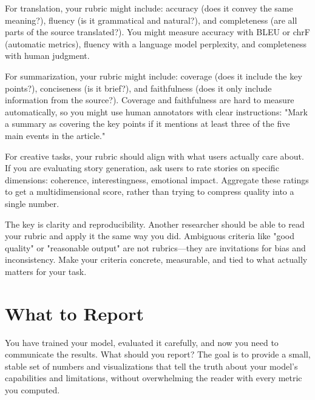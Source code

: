\vspace{0.3cm}

For translation, your rubric might include: accuracy (does it convey the same meaning?), fluency (is it grammatical and natural?), and completeness (are all parts of the source translated?). You might measure accuracy with BLEU or chrF (automatic metrics), fluency with a language model perplexity, and completeness with human judgment.

\vspace{0.3cm}

For summarization, your rubric might include: coverage (does it include the key points?), conciseness (is it brief?), and faithfulness (does it only include information from the source?). Coverage and faithfulness are hard to measure automatically, so you might use human annotators with clear instructions: "Mark a summary as covering the key points if it mentions at least three of the five main events in the article."

\vspace{0.3cm}

For creative tasks, your rubric should align with what users actually care about. If you are evaluating story generation, ask users to rate stories on specific dimensions: coherence, interestingness, emotional impact. Aggregate these ratings to get a multidimensional score, rather than trying to compress quality into a single number.

\vspace{0.3cm}

The key is clarity and reproducibility. Another researcher should be able to read your rubric and apply it the same way you did. Ambiguous criteria like "good quality" or "reasonable output" are not rubrics---they are invitations for bias and inconsistency. Make your criteria concrete, measurable, and tied to what actually matters for your task.

\vspace{2em}

\section{What to Report}

You have trained your model, evaluated it carefully, and now you need to communicate the results. What should you report? The goal is to provide a small, stable set of numbers and visualizations that tell the truth about your model's capabilities and limitations, without overwhelming the reader with every metric you computed.

